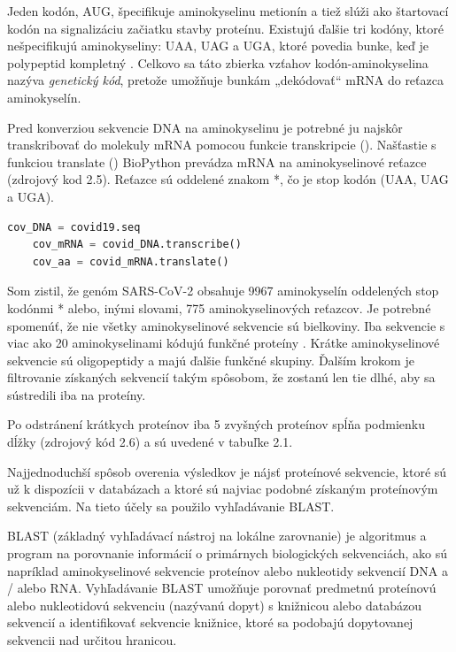 Jeden kodón, AUG, špecifikuje aminokyselinu metionín a tiež slúži ako štartovací kodón na signalizáciu začiatku stavby proteínu.
Existujú ďalšie tri kodóny, ktoré nešpecifikujú aminokyseliny: UAA, UAG a UGA, ktoré povedia bunke, keď je polypeptid kompletný \cite{aminouag}.
Celkovo sa táto zbierka vzťahov kodón-aminokyselina nazýva \textit{genetický kód}, pretože umožňuje bunkám „dekódovať“ mRNA do reťazca aminokyselín.

Pred konverziou sekvencie DNA na aminokyselinu je potrebné ju najskôr transkribovať do molekuly mRNA \cite{rnaseqexp} pomocou funkcie transkripcie ().
Našťastie s funkciou translate () BioPython prevádza mRNA na aminokyselinové reťazce (zdrojový kod 2.5).
Reťazce sú oddelené znakom *, čo je stop kodón (UAA, UAG a UGA).

\begin{lstlisting}[language=Python, caption=Prepis a preklad pomocou BioPythonu]
    cov_DNA = covid19.seq
    cov_mRNA = covid_DNA.transcribe()
    cov_aa = covid_mRNA.translate()
\end{lstlisting}

Som zistil, že genóm SARS-CoV-2 obsahuje 9967 aminokyselín oddelených stop kodónmi * alebo, inými slovami, 775 aminokyselinových reťazcov.
Je potrebné spomenúť, že nie všetky aminokyselinové sekvencie sú bielkoviny.
Iba sekvencie s viac ako 20 aminokyselinami kódujú funkčné proteíny \cite{cov1}.
Krátke aminokyselinové sekvencie sú oligopeptidy a majú ďalšie funkčné skupiny.
Ďalším krokom je filtrovanie získaných sekvencií takým spôsobom, že zostanú len tie dlhé, aby sa sústredili iba na proteíny.

Po odstránení krátkych proteínov iba 5 zvyšných proteínov spĺňa podmienku dĺžky (zdrojový kód 2.6) a sú uvedené v tabuľke 2.1.

Najjednoduchší spôsob overenia výsledkov je nájsť proteínové sekvencie, ktoré sú už k dispozícii v databázach a ktoré sú najviac podobné získaným proteínovým sekvenciám.
Na tieto účely sa použilo vyhľadávanie BLAST.

BLAST (základný vyhľadávací nástroj na lokálne zarovnanie) je algoritmus a program na porovnanie informácií o primárnych biologických sekvenciách, ako sú napríklad aminokyselinové sekvencie proteínov alebo nukleotidy sekvencií DNA a / alebo RNA.
Vyhľadávanie BLAST umožňuje porovnať predmetnú proteínovú alebo nukleotidovú sekvenciu (nazývanú dopyt) s knižnicou alebo databázou sekvencií a identifikovať sekvencie knižnice, ktoré sa podobajú dopytovanej sekvencii nad určitou hranicou.

